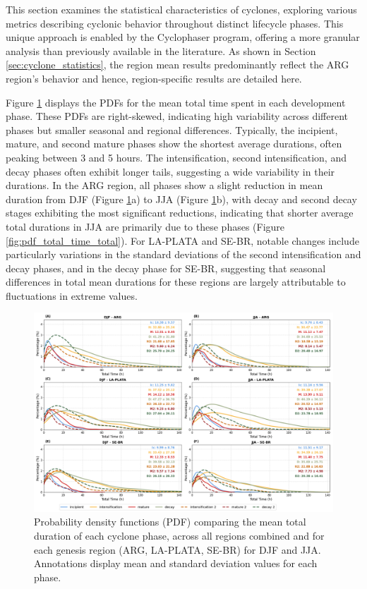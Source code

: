 This section examines the statistical characteristics of cyclones, exploring various metrics describing cyclonic behavior throughout distinct lifecycle phases. This unique approach is enabled by the Cyclophaser program, offering a more granular analysis than previously available in the literature. As shown in Section \ref{sec:cyclone_statistics}, the region mean results predominantly reflect the ARG region's behavior and hence, region-specific results are detailed here.

Figure \ref{fig:pdf_total_time} displays the PDFs for the mean total time spent in each development phase. These PDFs are right-skewed, indicating high variability across different phases but smaller seasonal and regional differences. Typically, the incipient, mature, and second mature phases show the shortest average durations, often peaking between 3 and 5 hours. The intensification, second intensification, and decay phases often exhibit longer tails, suggesting a wide variability in their durations. In the ARG region, all phases show a slight reduction in mean duration from DJF (Figure \ref{fig:pdf_total_time}a) to JJA (Figure \ref{fig:pdf_total_time}b), with decay and second decay stages exhibiting the most significant reductions, indicating that shorter average total durations in JJA are primarily due to these phases (Figure \ref{fig:pdf_total_time_total}). For LA-PLATA and SE-BR, notable changes include particularly variations in the standard deviations of the second intensification and decay phases, and in the decay phase for SE-BR, suggesting that seasonal differences in total mean durations for these regions are largely attributable to fluctuations in extreme values.

\begin{figure}[h!]
\centering
\includegraphics[width=\textwidth]{figs_4/pdf_total_time.png}
\caption[PDF - Total Time]{Probability density functions (PDF) comparing the mean total duration of each cyclone phase, across all regions combined and for each genesis region (ARG, LA-PLATA, SE-BR) for DJF and JJA. Annotations display mean and standard deviation values for each phase.}
\label{fig:pdf_total_time}
\end{figure}

